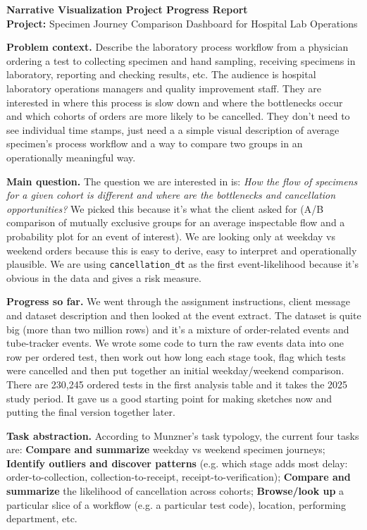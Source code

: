 \documentclass[10pt]{article}
\begin{document}
{\Large \textbf{Narrative Visualization Project Progress Report}}\\[-0.2em]
\textbf{Project:} Specimen Journey Comparison Dashboard for Hospital Lab Operations

\textbf{Problem context.} Describe the laboratory process workflow from a physician ordering a test to collecting specimen and hand sampling, receiving specimens in laboratory, reporting and checking results, etc. The audience is hospital laboratory operations managers and quality improvement staff. They are interested in where this process is slow down and where the bottlenecks occur and which cohorts of orders are more likely to be cancelled. They don't need to see individual time stamps, just need a a simple visual description of average specimen's process workflow and a way to compare two groups in an operationally meaningful way.

\textbf{Main question.} The question we are interested in is: \emph{How the flow of specimens for a given cohort is different and where are the bottlenecks and cancellation opportunities?} We picked this because it's what the client asked for (A/B comparison of mutually exclusive groups for an average inspectable flow and a probability plot for an event of interest). We are looking only at weekday vs weekend orders because this is easy to derive, easy to interpret and operationally plausible. We are using \texttt{cancellation\_dt} as the first event-likelihood because it's obvious in the data and gives a risk measure.

\textbf{Progress so far.} We went through the assignment instructions, client message and dataset description and then looked at the event extract. The dataset is quite big (more than two million rows) and it’s a mixture of order-related events and tube-tracker events. We wrote some code to turn the raw events data into one row per ordered test, then work out how long each stage took, flag which tests were cancelled and then put together an initial weekday/weekend comparison. There are 230,245 ordered tests in the first analysis table and it takes the 2025 study period. It gave us a good starting point for making sketches now and putting the final version together later.

\textbf{Task abstraction.} According to Munzner's task typology, the current four tasks are: \textbf{Compare and summarize} weekday vs weekend specimen journeys; \textbf{Identify outliers and discover patterns} (e.g. which stage adds most delay: order-to-collection, collection-to-receipt, receipt-to-verification); \textbf{Compare and summarize} the likelihood of cancellation across cohorts; \textbf{Browse/look up} a particular slice of a workflow (e.g. a particular test code), location, performing department, etc.
\end{document}
